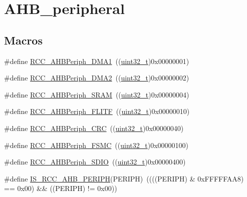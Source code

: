 \hypertarget{group___a_h_b__peripheral}{}\section{A\+H\+B\+\_\+peripheral}
\label{group___a_h_b__peripheral}
\subsection*{Macros}
\begin{DoxyCompactItemize}
\item 
\#define \hyperlink{group___a_h_b__peripheral_gaf32783f8481c4343726994073918b3ff}{R\+C\+C\+\_\+\+A\+H\+B\+Periph\+\_\+\+D\+M\+A1}~((\hyperlink{_p_e___types_8h_a33594304e786b158f3fb30289278f5af}{uint32\+\_\+t})0x00000001)
\item 
\#define \hyperlink{group___a_h_b__peripheral_ga5afb68e40dc0b0f1aa00466e49bc9e70}{R\+C\+C\+\_\+\+A\+H\+B\+Periph\+\_\+\+D\+M\+A2}~((\hyperlink{_p_e___types_8h_a33594304e786b158f3fb30289278f5af}{uint32\+\_\+t})0x00000002)
\item 
\#define \hyperlink{group___a_h_b__peripheral_ga8aec305b766b1c0ae297f8e1be103bd1}{R\+C\+C\+\_\+\+A\+H\+B\+Periph\+\_\+\+S\+R\+AM}~((\hyperlink{_p_e___types_8h_a33594304e786b158f3fb30289278f5af}{uint32\+\_\+t})0x00000004)
\item 
\#define \hyperlink{group___a_h_b__peripheral_ga4277d70aa6b5e0b1ec6c8fb8180aac08}{R\+C\+C\+\_\+\+A\+H\+B\+Periph\+\_\+\+F\+L\+I\+TF}~((\hyperlink{_p_e___types_8h_a33594304e786b158f3fb30289278f5af}{uint32\+\_\+t})0x00000010)
\item 
\#define \hyperlink{group___a_h_b__peripheral_gaef0cd08bcf96323324f328675ccd5ac3}{R\+C\+C\+\_\+\+A\+H\+B\+Periph\+\_\+\+C\+RC}~((\hyperlink{_p_e___types_8h_a33594304e786b158f3fb30289278f5af}{uint32\+\_\+t})0x00000040)
\item 
\#define \hyperlink{group___a_h_b__peripheral_ga857dbf7044a974efb142c4450eafd609}{R\+C\+C\+\_\+\+A\+H\+B\+Periph\+\_\+\+F\+S\+MC}~((\hyperlink{_p_e___types_8h_a33594304e786b158f3fb30289278f5af}{uint32\+\_\+t})0x00000100)
\item 
\#define \hyperlink{group___a_h_b__peripheral_gaa2664a55eedcedff22532982ae753566}{R\+C\+C\+\_\+\+A\+H\+B\+Periph\+\_\+\+S\+D\+IO}~((\hyperlink{_p_e___types_8h_a33594304e786b158f3fb30289278f5af}{uint32\+\_\+t})0x00000400)
\item 
\#define \hyperlink{group___a_h_b__peripheral_ga5fbf97a9c9f5742c94cde6ffe389aedc}{I\+S\+\_\+\+R\+C\+C\+\_\+\+A\+H\+B\+\_\+\+P\+E\+R\+I\+PH}(P\+E\+R\+I\+PH)~((((P\+E\+R\+I\+PH) \& 0x\+F\+F\+F\+F\+F\+A\+A8) == 0x00) \&\& ((\+P\+E\+R\+I\+P\+H) != 0x00))

\end{DoxyCompactItemize}
